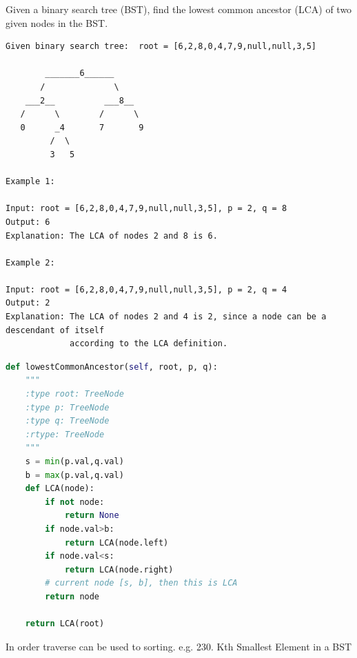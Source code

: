 \documentclass[data-structure.tex]{subfiles}
\begin{document}
 Given a binary search tree (BST), find the lowest common ancestor (LCA) of two given nodes in the BST.
\begin{lstlisting}
Given binary search tree:  root = [6,2,8,0,4,7,9,null,null,3,5]

        _______6______
       /              \
    ___2__          ___8__
   /      \        /      \
   0      _4       7       9
         /  \
         3   5

Example 1:

Input: root = [6,2,8,0,4,7,9,null,null,3,5], p = 2, q = 8
Output: 6
Explanation: The LCA of nodes 2 and 8 is 6.

Example 2:

Input: root = [6,2,8,0,4,7,9,null,null,3,5], p = 2, q = 4
Output: 2
Explanation: The LCA of nodes 2 and 4 is 2, since a node can be a descendant of itself 
             according to the LCA definition.
\end{lstlisting}
\begin{lstlisting}[language=Python]
def lowestCommonAncestor(self, root, p, q):
    """
    :type root: TreeNode
    :type p: TreeNode
    :type q: TreeNode
    :rtype: TreeNode
    """
    s = min(p.val,q.val)
    b = max(p.val,q.val)
    def LCA(node):
        if not node:
            return None
        if node.val>b:
            return LCA(node.left)
        if node.val<s:
            return LCA(node.right)
        # current node [s, b], then this is LCA 
        return node
        
    return LCA(root)
\end{lstlisting}
 
In order traverse can be used to sorting. e.g. 230. Kth Smallest Element in a BST



\end{document}

